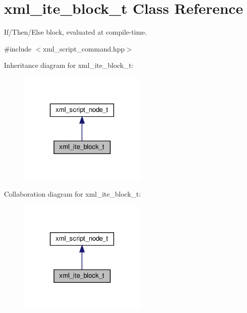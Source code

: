 \hypertarget{classxml__ite__block__t}{}\section{xml\+\_\+ite\+\_\+block\+\_\+t Class Reference}
\label{classxml__ite__block__t}


If/\+Then/\+Else block, evaluated at compile-\/time.  




{\ttfamily \#include $<$xml\+\_\+script\+\_\+command.\+hpp$>$}



Inheritance diagram for xml\+\_\+ite\+\_\+block\+\_\+t\+:
\nopagebreak
\begin{figure}[H]
\begin{center}
\leavevmode
\includegraphics[width=176pt]{db/d60/classxml__ite__block__t__inherit__graph}
\end{center}
\end{figure}


Collaboration diagram for xml\+\_\+ite\+\_\+block\+\_\+t\+:
\nopagebreak
\begin{figure}[H]
\begin{center}
\leavevmode
\includegraphics[width=176pt]{d8/d96/classxml__ite__block__t__coll__graph}
\end{center}
\end{figure}
